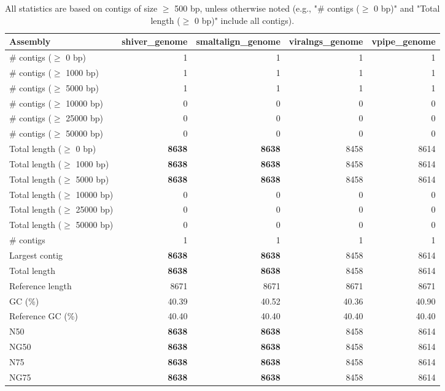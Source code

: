\documentclass[12pt,a4paper]{article}
\begin{document}
\begin{table}[ht]
\begin{center}
\caption{All statistics are based on contigs of size $\geq$ 500 bp, unless otherwise noted (e.g., "\# contigs ($\geq$ 0 bp)" and "Total length ($\geq$ 0 bp)" include all contigs).}
\begin{tabular}{|l*{4}{|r}|}
\hline
Assembly & shiver\_genome & smaltalign\_genome & viralngs\_genome & vpipe\_genome \\ \hline
\# contigs ($\geq$ 0 bp) & 1 & 1 & 1 & 1 \\ \hline
\# contigs ($\geq$ 1000 bp) & 1 & 1 & 1 & 1 \\ \hline
\# contigs ($\geq$ 5000 bp) & 1 & 1 & 1 & 1 \\ \hline
\# contigs ($\geq$ 10000 bp) & 0 & 0 & 0 & 0 \\ \hline
\# contigs ($\geq$ 25000 bp) & 0 & 0 & 0 & 0 \\ \hline
\# contigs ($\geq$ 50000 bp) & 0 & 0 & 0 & 0 \\ \hline
Total length ($\geq$ 0 bp) & {\bf 8638} & {\bf 8638} & 8458 & 8614 \\ \hline
Total length ($\geq$ 1000 bp) & {\bf 8638} & {\bf 8638} & 8458 & 8614 \\ \hline
Total length ($\geq$ 5000 bp) & {\bf 8638} & {\bf 8638} & 8458 & 8614 \\ \hline
Total length ($\geq$ 10000 bp) & 0 & 0 & 0 & 0 \\ \hline
Total length ($\geq$ 25000 bp) & 0 & 0 & 0 & 0 \\ \hline
Total length ($\geq$ 50000 bp) & 0 & 0 & 0 & 0 \\ \hline
\# contigs & 1 & 1 & 1 & 1 \\ \hline
Largest contig & {\bf 8638} & {\bf 8638} & 8458 & 8614 \\ \hline
Total length & {\bf 8638} & {\bf 8638} & 8458 & 8614 \\ \hline
Reference length & 8671 & 8671 & 8671 & 8671 \\ \hline
GC (\%) & 40.39 & 40.52 & 40.36 & 40.90 \\ \hline
Reference GC (\%) & 40.40 & 40.40 & 40.40 & 40.40 \\ \hline
N50 & {\bf 8638} & {\bf 8638} & 8458 & 8614 \\ \hline
NG50 & {\bf 8638} & {\bf 8638} & 8458 & 8614 \\ \hline
N75 & {\bf 8638} & {\bf 8638} & 8458 & 8614 \\ \hline
NG75 & {\bf 8638} & {\bf 8638} & 8458 & 8614 \\ \hline

\end{tabular}
\end{center}
\end{table}
\end{document}
